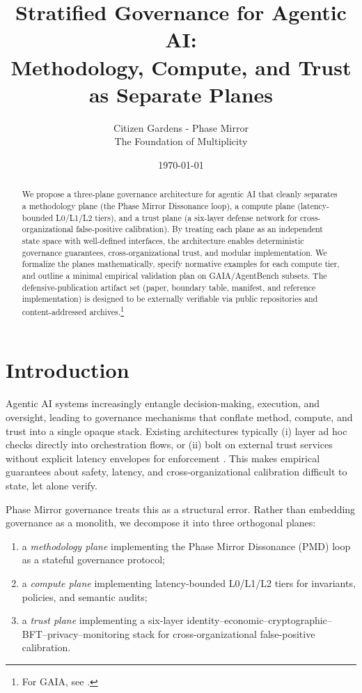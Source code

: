 \documentclass[11pt]{article}
\title{Stratified Governance for Agentic AI:\\
Methodology, Compute, and Trust as Separate Planes}
\author{Citizen Gardens - Phase Mirror \\ The Foundation of Multiplicity}
\date{\today}
\begin{document}
\maketitle

\begin{abstract}
We propose a three-plane governance architecture for agentic AI that cleanly separates a methodology plane (the Phase Mirror Dissonance loop), a compute plane (latency-bounded L0/L1/L2 tiers), and a trust plane (a six-layer defense network for cross-organizational false-positive calibration). By treating each plane as an independent state space with well-defined interfaces, the architecture enables deterministic governance guarantees, cross-organizational trust, and modular implementation. We formalize the planes mathematically, specify normative examples for each compute tier, and outline a minimal empirical validation plan on GAIA/AgentBench subsets. The defensive-publication artifact set (paper, boundary table, manifest, and reference implementation) is designed to be externally verifiable via public repositories and content-addressed archives.\footnote{For GAIA, see \cite{gaia_arxiv,gaia_benchmark}.}
\end{abstract}

\section{Introduction}

Agentic AI systems increasingly entangle decision-making, execution, and oversight, leading to governance mechanisms that conflate method, compute, and trust into a single opaque stack. Existing architectures typically (i) layer ad hoc checks directly into orchestration flows, or (ii) bolt on external trust services without explicit latency envelopes for enforcement \cite{three_tier_arch,bain_three_layers,gov_as_service}. This makes empirical guarantees about safety, latency, and cross-organizational calibration difficult to state, let alone verify.

Phase Mirror governance treats this as a structural error. Rather than embedding governance as a monolith, we decompose it into three orthogonal planes:

\begin{enumerate}[label=\alph*)]
  \item a \emph{methodology plane} implementing the Phase Mirror Dissonance (PMD) loop as a stateful governance protocol;
  \item a \emph{compute plane} implementing latency-bounded L0/L1/L2 tiers for invariants, policies, and semantic audits;
  \item a \emph{trust plane} implementing a six-layer identity–economic–cryptographic–BFT–privacy–monitoring stack for cross-organizational false-positive calibration.
\end{enumerate}
\end{document}
